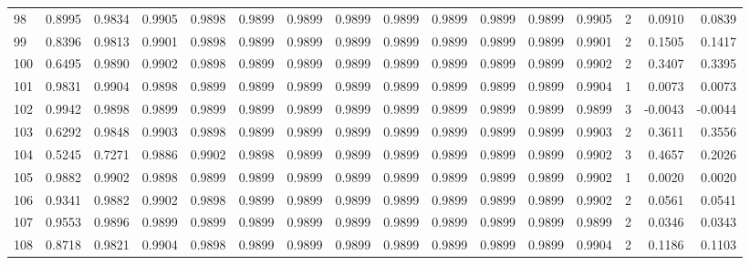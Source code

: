 \begin{tabular}{lrrrrrrrrrrrrrrr}
98  &      0.8995 &  0.9834 &  0.9905 &  0.9898 &  0.9899 &  0.9899 &  0.9899 &  0.9899 &  0.9899 &  0.9899 &   0.9899 &     0.9905 &      2 &                    0.0910 &                     0.0839 \\
99  &      0.8396 &  0.9813 &  0.9901 &  0.9898 &  0.9899 &  0.9899 &  0.9899 &  0.9899 &  0.9899 &  0.9899 &   0.9899 &     0.9901 &      2 &                    0.1505 &                     0.1417 \\
100 &      0.6495 &  0.9890 &  0.9902 &  0.9898 &  0.9899 &  0.9899 &  0.9899 &  0.9899 &  0.9899 &  0.9899 &   0.9899 &     0.9902 &      2 &                    0.3407 &                     0.3395 \\
101 &      0.9831 &  0.9904 &  0.9898 &  0.9899 &  0.9899 &  0.9899 &  0.9899 &  0.9899 &  0.9899 &  0.9899 &   0.9899 &     0.9904 &      1 &                    0.0073 &                     0.0073 \\
102 &      0.9942 &  0.9898 &  0.9899 &  0.9899 &  0.9899 &  0.9899 &  0.9899 &  0.9899 &  0.9899 &  0.9899 &   0.9899 &     0.9899 &      3 &                   -0.0043 &                    -0.0044 \\
103 &      0.6292 &  0.9848 &  0.9903 &  0.9898 &  0.9899 &  0.9899 &  0.9899 &  0.9899 &  0.9899 &  0.9899 &   0.9899 &     0.9903 &      2 &                    0.3611 &                     0.3556 \\
104 &      0.5245 &  0.7271 &  0.9886 &  0.9902 &  0.9898 &  0.9899 &  0.9899 &  0.9899 &  0.9899 &  0.9899 &   0.9899 &     0.9902 &      3 &                    0.4657 &                     0.2026 \\
105 &      0.9882 &  0.9902 &  0.9898 &  0.9899 &  0.9899 &  0.9899 &  0.9899 &  0.9899 &  0.9899 &  0.9899 &   0.9899 &     0.9902 &      1 &                    0.0020 &                     0.0020 \\
106 &      0.9341 &  0.9882 &  0.9902 &  0.9898 &  0.9899 &  0.9899 &  0.9899 &  0.9899 &  0.9899 &  0.9899 &   0.9899 &     0.9902 &      2 &                    0.0561 &                     0.0541 \\
107 &      0.9553 &  0.9896 &  0.9899 &  0.9899 &  0.9899 &  0.9899 &  0.9899 &  0.9899 &  0.9899 &  0.9899 &   0.9899 &     0.9899 &      2 &                    0.0346 &                     0.0343 \\
108 &      0.8718 &  0.9821 &  0.9904 &  0.9898 &  0.9899 &  0.9899 &  0.9899 &  0.9899 &  0.9899 &  0.9899 &   0.9899 &     0.9904 &      2 &                    0.1186 &                     0.1103 \\

\end{tabular}

